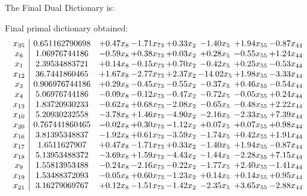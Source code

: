 \documentclass[8pt]{article}
\begin{document}
The Final Dual Dictionary is: 

 Final primal dictionary obtained: 
\[\begin{array}{c| c c@{\hskip 2pt} c@{\hskip 2pt} c@{\hskip 2pt} c@{\hskip 2pt} c@{\hskip 2pt} c@{\hskip 2pt} }
 x_{35}   &  0.651162790698 & +  0.47 x_{8} & -1.71 x_{73} & +  0.33 x_{2} & -1.40 x_{5} & +  1.94 x_{55} & -0.87 x_{44}\\
 x_{6}   &  1.06976744186 & -0.59 x_{8} & +  0.38 x_{73} & +  0.03 x_{2} & +  0.28 x_{5} & -0.55 x_{55} & +  1.24 x_{44}\\
 x_{1}   &  2.39534883721 & +  0.14 x_{8} & -0.15 x_{73} & +  0.70 x_{2} & -0.42 x_{5} & +  0.25 x_{55} & -0.53 x_{44}\\
 x_{12}   &  36.7441860465 & +  1.67 x_{8} & -2.77 x_{73} & +  2.37 x_{2} & -14.02 x_{5} & +  1.98 x_{55} & -3.33 x_{44}\\
 x_{3}   &  0.906976744186 & +  0.29 x_{8} & -0.45 x_{73} & -0.55 x_{2} & -0.37 x_{5} & +  0.46 x_{55} & -0.54 x_{44}\\
 x_{4}   &  5.06976744186 & -0.09 x_{8} & -0.12 x_{73} & -0.47 x_{2} & -0.72 x_{5} & -0.05 x_{55} & +  0.24 x_{44}\\
 x_{13}   &  1.83720930233 & -0.62 x_{8} & +  0.68 x_{73} & -2.08 x_{2} & -0.65 x_{5} & -0.48 x_{55} & +  2.22 x_{44}\\
 x_{10}   &  5.20930232558 & -3.78 x_{8} & +  1.46 x_{73} & -4.90 x_{2} & -2.16 x_{5} & -2.33 x_{55} & +  7.39 x_{44}\\
 x_{20}   &  0.767441860465 & -0.02 x_{8} & +  0.30 x_{73} & -1.12 x_{2} & +  0.07 x_{5} & +  0.07 x_{55} & +  0.98 x_{44}\\
 x_{16}   &  3.81395348837 & -1.92 x_{8} & +  0.61 x_{73} & -3.59 x_{2} & -1.74 x_{5} & +  0.42 x_{55} & +  1.91 x_{44}\\
 x_{17}   &  1.6511627907 & +  0.47 x_{8} & -1.71 x_{73} & +  0.33 x_{2} & -1.40 x_{5} & +  1.94 x_{55} & -0.87 x_{44}\\
 x_{18}   &  5.13953488372 & -3.69 x_{8} & +  1.59 x_{73} & -4.43 x_{2} & -1.44 x_{5} & -2.28 x_{55} & +  7.15 x_{44}\\
 x_{9}   &  1.55813953488 & -0.24 x_{8} & -2.16 x_{73} & -0.22 x_{2} & -1.77 x_{5} & +  2.40 x_{55} & -1.41 x_{44}\\
 x_{19}   &  1.53488372093 & -0.05 x_{8} & +  0.60 x_{73} & -1.23 x_{2} & +  0.14 x_{5} & +  0.14 x_{55} & +  0.95 x_{44}\\
 x_{21}   &  3.16279069767 & +  0.12 x_{8} & -1.51 x_{73} & -1.42 x_{2} & -2.35 x_{5} & +  3.65 x_{55} & -2.88 x_{44}\\

\end{array}\]
\end{document}
